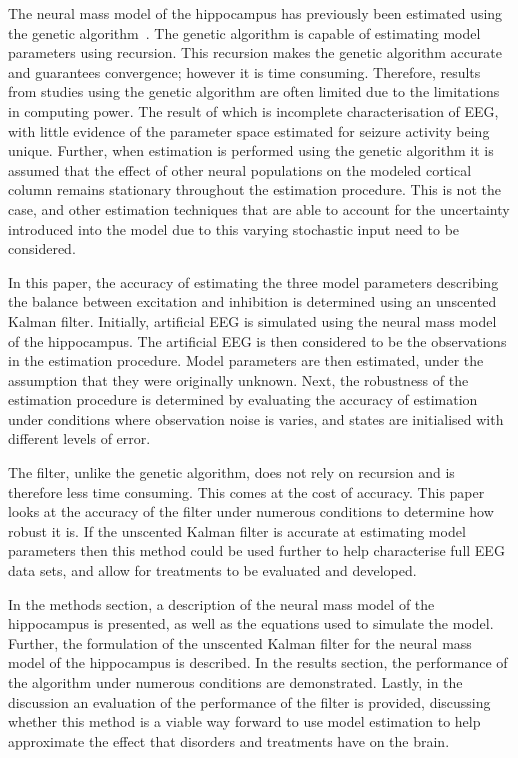 The neural mass model of the hippocampus has previously been estimated using the genetic algorithm~\citep{wendling2005interictal}. The genetic algorithm is capable of estimating model parameters using recursion. This recursion makes the genetic algorithm accurate and guarantees convergence; however it is time consuming. Therefore, results from studies using the genetic algorithm are often limited due to the limitations in computing power. The result of which is incomplete characterisation of EEG, with little evidence of the parameter space estimated for seizure activity being unique. Further, when estimation is performed using the genetic algorithm it is assumed that the effect of other neural populations on the modeled cortical column remains stationary throughout the estimation procedure. This is not the case, and other estimation techniques that are able to account for the uncertainty introduced into the model due to this varying stochastic input need to be considered. 





In this paper, the accuracy of estimating the three model parameters describing the balance between excitation and inhibition is determined using an unscented Kalman filter. Initially, artificial EEG is simulated using the neural mass model of the hippocampus. The artificial EEG is then considered to be the observations in the estimation procedure. Model parameters are then estimated, under the assumption that they were originally unknown. Next, the robustness of the estimation procedure is determined by evaluating the accuracy of estimation under conditions where observation noise is varies, and states are initialised with different levels of error.

The filter, unlike the genetic algorithm, does not rely on recursion and is therefore less time consuming. This comes at the cost of accuracy. This paper looks at the accuracy of the filter under numerous conditions to determine how robust it is. If the unscented Kalman filter is accurate at estimating model parameters then this method could be used further to help characterise full EEG data sets, and allow for treatments to be evaluated and developed.

In the methods section, a description of the neural mass model of the hippocampus is presented, as well as the equations used to simulate the model. Further, the formulation of the unscented Kalman filter for the neural mass model of the hippocampus is described. In the results section, the performance of the algorithm under numerous conditions are demonstrated. Lastly, in the discussion an evaluation of the performance of the filter is provided, discussing whether this method is a viable way forward to use model estimation to help approximate the effect that disorders and treatments have on the brain. 
